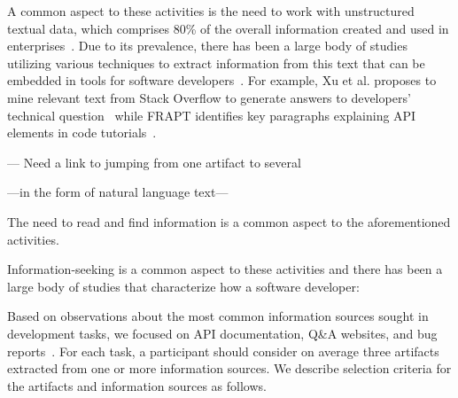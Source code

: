 A common aspect to these activities is the need to work with unstructured textual data, which comprises 80\% of the overall information created and used in enterprises~\cite{Bavota2014, holzinger2013}.
Due to its prevalence, there has been a large body of studies utilizing various techniques to extract
information from this text that can be embedded in
tools for software developers~\cite{Bavota2014, Xu2017, Robillard2015, Lotufo2012}. For example, Xu et al. proposes to mine relevant text from Stack Overflow
to generate answers to developers' technical question~\cite{Xu2017}
while FRAPT identifies key paragraphs explaining API elements in code tutorials~\cite{Jiang2017}.




--- Need a link to jumping from one artifact to several












---in the form of natural language text---


The need to read and find information is a common aspect to the aforementioned activities.





Information-seeking is a common aspect to these activities and there has been a large body of studies 
that characterize how a software developer:



Based on
observations about the most common information sources sought in
development tasks,
we focused on API documentation, Q\&A websites, and
bug reports~\cite{Li2013, Ponzanelli2017}.
For each task, a participant should consider on average three artifacts extracted
from one or more information sources.
We describe selection criteria for the artifacts and information sources as follows.




